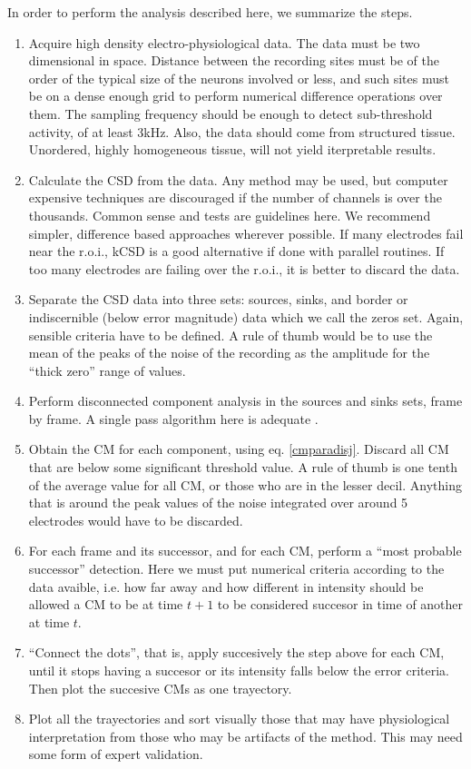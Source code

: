 \documentclass[12pt]{article}
\begin{document}
 In order to perform the analysis described here, we summarize the steps.
 \begin{enumerate}
 \item Acquire high density electro-physiological data. The data must be two dimensional
   in space. Distance between the recording sites must be of the order of the typical
   size of the neurons involved or less, and such sites must be on a dense enough grid to perform numerical difference operations over them.
   The sampling frequency should be enough to detect sub-threshold activity,
   of at least 3kHz. Also, the data should come from structured tissue.
   Unordered, highly homogeneous tissue, will not yield iterpretable results. 
 \item Calculate the CSD from the data. Any method may be used,
   but computer expensive techniques are discouraged if the
   number of channels is over the thousands.
   Common sense and tests are guidelines here. We recommend simpler, difference based approaches wherever possible. If many electrodes fail near the r.o.i.,
   kCSD is a good alternative if done with
   parallel routines.
   If too many electrodes are failing over the r.o.i., it is better to discard the data. 
 \item Separate the CSD data into three sets: sources, sinks, and border or indiscernible (below error magnitude) data
   which we call the zeros set. Again, sensible criteria have to be defined.
   A rule of thumb would be to use the mean of the peaks of the noise  of the recording as the amplitude for the ``thick zero'' range of values. 
\item Perform disconnected component analysis in the sources and sinks sets, frame by frame.
  A single pass algorithm here is  adequate \cite{Vincent91, Abubaker07}.
\item  Obtain the CM for each component, using eq. \ref{cmparadisj}. Discard
  all CM that are below some significant threshold value. A rule of thumb is one tenth of the average value for all CM,
  or those who are in the lesser decil. Anything that is around the peak
  values of the noise integrated over around 5 electrodes would have to be discarded.
\item For each frame and its successor, and for each CM, perform a ``most probable successor'' detection. Here we must put numerical criteria according to the data avaible, i.e. how far away and how different in intensity should be allowed a CM to be at time $t+1$ to be considered succesor in time of another at time $t$.
\item ``Connect the dots'', that is, apply succesively the step above for each CM, until it stops having a succesor or its intensity falls below the error criteria. Then plot the succesive CMs as one trayectory.
\item Plot all the trayectories and sort visually those that may have physiological interpretation from those who may be artifacts of the method. This may need some form of expert validation.
 \end{enumerate}
 
\end{document}

